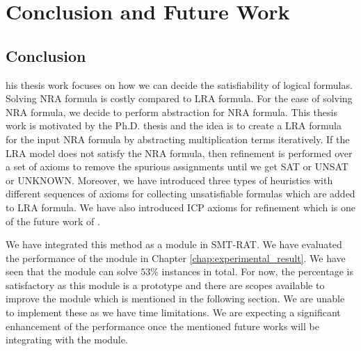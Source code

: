 \chapter{Conclusion and Future Work}
\label{chap:conclusion_and_Future_Work}
\section{Conclusion}
\label{sec:Conclusion}
his thesis work focuses on how we can decide the satisfiability of logical formulas.
Solving NRA formula is costly compared to LRA formula.
For the ease of solving NRA formula, we decide to perform abstraction for NRA formula.
This thesis work is motivated by the Ph.D. thesis \cite{Cimatti:2018:ILS:3274693.3230639} and the idea is to create a LRA formula for the input NRA formula by abstracting multiplication terms iteratively.
If the LRA model does not satisfy the NRA formula, then refinement is performed over a set of axioms to remove the spurious assignments until we get SAT or UNSAT or UNKNOWN.
Moreover, we have introduced three types of heuristics with different sequences of axioms for collecting unsatisfiable formulas which are added to LRA formula.
We have also introduced ICP axioms for refinement which is one of the future work of \cite{Cimatti:2018:ILS:3274693.3230639}.\newline

\noindent We have integrated this method as a module in SMT-RAT.
We have evaluated the performance of the module in Chapter \ref{chap:experimental_result}.
We have seen that the module can solve $53\%$ instances in total.
For now, the percentage is satisfactory as this module is a prototype and there are scopes available to improve the module which is mentioned in the following section.
We are unable to implement these as we have time limitations.
We are expecting a significant enhancement of the performance once the mentioned future works will be integrating with the module.

